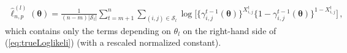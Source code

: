 \documentclass[12pt]{article}
\newtheorem{remark}{Remark}
\newcommand{\bTheta}{\boldsymbol \Theta}
\newcommand{\btheta}{\boldsymbol \theta}
\newcommand{\bX}{{\bf X}}
\newcommand{\cJ}{{\cal J}}
\newcommand{\0}{{\bf 0}}
\begin{document}
%
\begin{align}\label{logL:local}
    \hat{\ell}_{n,p}^{(l)}(\btheta) =\frac{1}{(n-m)|\mathcal{S}_l|}  \sum_{t=m+1}^n\sum_{ (i,j) \in \mathcal{S}_l}\log\big[\{\gamma_{i,j}^{t-1}(\btheta)\}^{X_{i,j}^t}\{1-\gamma_{i,j}^{t-1}(\btheta)\}^{1-X_{i,j}^t}\big]\,,
\end{align}
which contains only the terms depending on $\theta_l$ on the right-hand side of (\ref{eq:trueLoglikeli}) (with a rescaled normalized constant).
\end{document}
